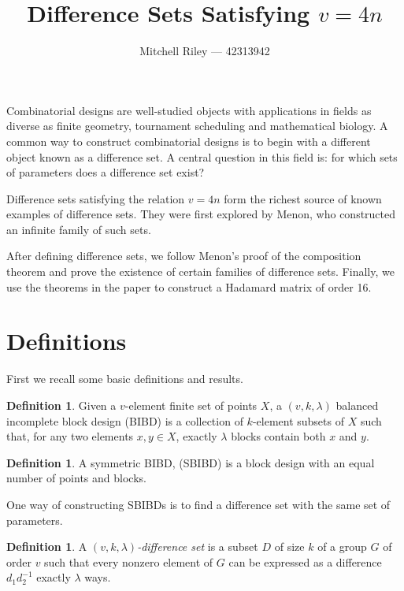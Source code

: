 \documentclass[12pt,a4paper]{article}
\author{Mitchell Riley --- 42313942}
\title{Difference Sets Satisfying $v = 4n$}
\theoremstyle{definition}
\newtheorem{definition}[theorem]{Definition}
\begin{document}
\maketitle

Combinatorial designs are well-studied objects with applications in fields as diverse as finite geometry, tournament scheduling and mathematical biology. A common way to construct combinatorial designs is to begin with a different object known as a difference set. A central question in this field is: for which sets of parameters does a difference set exist?

Difference sets satisfying the relation $v = 4n$ form the richest source of known examples of difference sets. They were first explored by Menon\cite{menon1962difference}, who constructed an infinite family of such sets.

After defining difference sets, we follow Menon's proof of the composition theorem and prove the existence of certain families of difference sets. Finally, we use the theorems in the paper to construct a Hadamard matrix of order 16.

\section{Definitions}

First we recall some basic definitions and results.

\begin{definition}
Given a $v$-element finite set of points $X$, a $(v, k, \lambda)$ balanced incomplete block design (BIBD) is a collection of $k$-element subsets of $X$ such that, for any two elements $x, y \in X$, exactly $\lambda$ blocks contain both $x$ and $y$.
\end{definition}

\begin{definition}
A symmetric BIBD, (SBIBD) is a block design with an equal number of points and blocks.
\end{definition}

One way of constructing SBIBDs is to find a difference set with the same set of parameters.

\begin{definition}
A \emph{$(v, k, \lambda)$-difference set} is a subset $D$ of size $k$ of a group $G$ of order $v$ such that every nonzero element of $G$ can be expressed as a difference $d_1 d_2^{-1}$ exactly $\lambda$ ways.
\end{definition}
\end{document}
